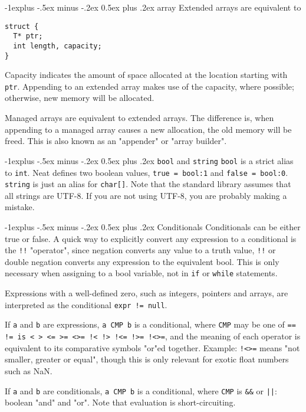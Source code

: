 \documentclass[a4paper,10pt,landscape]{article}
\makeatletter
\newenvironment{segment}[1]
{\begin{mdframed}[roundcorner=5pt]\subsection{#1}}
{\end{mdframed}\vspace{2pt plus 5pt}}
\renewcommand{\subsection}{\@startsection{subsection}{2}{0mm}%
			      {-1explus -.5ex minus -.2ex}%
			      {0.5ex plus .2ex}%
			      {\normalfont\normalsize\bfseries}}
\makeatother
\begin{document}
\begin{multicols}{3}
\begin{segment}{array}
Extended arrays are equivalent to
\begin{lstlisting}
struct {
  T* ptr;
  int length, capacity;
}
\end{lstlisting}

Capacity indicates the amount of space allocated at the location starting with \texttt{ptr}.
Appending to an extended array makes use of the capacity, where possible; otherwise, new memory
will be allocated.

Managed arrays are equivalent to extended arrays. The difference is, when appending to a managed
array causes a new allocation, the old memory will be freed. This is also known as an "appender"
or "array builder".

\end{segment}

\begin{segment}{\texttt{bool} and \texttt{string}}
\texttt{bool} is a strict alias to \texttt{int}. Neat defines two boolean values,
\texttt{true = bool:1} and \texttt{false = bool:0}.\\
\texttt{string} is just an alias for \texttt{char[]}. Note that the standard library assumes
that all strings are UTF-8. If you are not using UTF-8, you are probably making a mistake.
\end{segment}

\begin{segment}{Conditionals}
Conditionals can be either true or false. A quick way to explicitly convert any expression to a
conditional is the \texttt{!!} "operator", since negation converts any value to a truth value,
\texttt{!!} or double negation converts any expression to the equivalent bool. This is only necessary
when assigning to a bool variable, not in \texttt{if} or \texttt{while} statements.

Expressions with a well-defined zero, such as integers, pointers and arrays, are interpreted as
the conditional \texttt{expr != null}.

If \texttt{a} and \texttt{b} are expressions, \texttt{a CMP b} is a conditional, where
\texttt{CMP} may be one of \texttt{== != is < > <= >= <>= !< !> !<= !>= !<>=}, and the meaning of each
operator is equivalent to its comparative symbols "or"ed together. Example: \texttt{!<>=} means "not
smaller, greater or equal", though this is only relevant for exotic float numbers such as NaN.

If \texttt{a} and \texttt{b} are conditionals, \texttt{a CMP b} is a conditional, where \texttt{CMP}
is \texttt{\&\&} or \texttt{||}: boolean "and" and "or". Note that evaluation is short-circuiting.


\end{segment}
\end{multicols}
\end{document}
